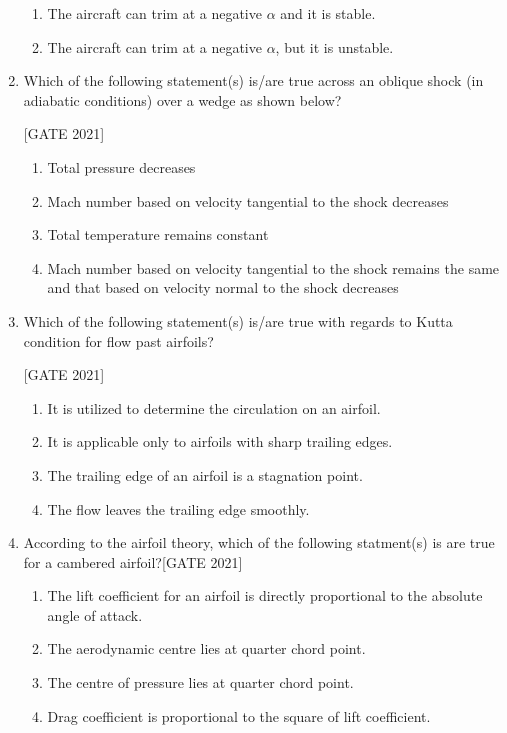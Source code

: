 \documentclass[journal,12pt,onecolumn]{IEEEtran}
\theoremstyle{remark}
\begin{document}
\begin{enumerate}
\begin{enumerate}
\item The aircraft can trim at a negative $\alpha$ and it is stable.

\item The aircraft can trim at a negative $\alpha$, but it is unstable.
\end{enumerate}
\item Which of the following statement(s) is/are true across an oblique shock (in adiabatic conditions) over a wedge as shown below?


 \hfill{[GATE 2021]}\begin{enumerate}
    \item Total pressure decreases
    \item Mach number based on velocity tangential to the shock decreases
    \item Total temperature remains constant
    \item Mach number based on velocity tangential to the shock remains the same and that based on velocity normal to the shock decreases
\end{enumerate}

\bigskip

\item Which of the following statement(s) is/are true with regards to Kutta condition for flow past airfoils?

 \hfill{[GATE 2021]}\begin{enumerate}
    \item It is utilized to determine the circulation on an airfoil.
    \item It is applicable only to airfoils with sharp trailing edges.
    \item The trailing edge of an airfoil is a stagnation point.
    \item The flow leaves the trailing edge smoothly.
\end{enumerate}
\item According to the airfoil theory, which of the following statment(s) is are true for a cambered airfoil?\hfill{[GATE 2021]}\begin{enumerate}
\item The lift coefficient for an airfoil is directly proportional to the absolute angle of attack. 
\item The aerodynamic centre lies at quarter chord point.
\item The centre of pressure lies at quarter chord point.
\item Drag coefficient is proportional to the square of lift coefficient.
\end{enumerate}
\end{enumerate}
\end{document}
